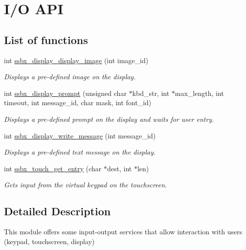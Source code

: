 \hypertarget{group__ssbx___i_o}{}\section{I/O A\+PI}
\label{group__ssbx___i_o}
\subsection*{List of functions}
\begin{DoxyCompactItemize}
\item 
int \hyperlink{group__ssbx___i_o_ga52d5005d7bb36355592b9ef2309281e2}{ssbx\+\_\+display\+\_\+display\+\_\+image} (int image\+\_\+id)
\begin{DoxyCompactList}\small\item\em Displays a pre-\/defined image on the display. \end{DoxyCompactList}\item 
int \hyperlink{group__ssbx___i_o_ga701c4c43823bad80a39745de2b5ad3af}{ssbx\+\_\+display\+\_\+prompt} (unsigned char $\ast$kbd\+\_\+str, int $\ast$max\+\_\+length, int timeout, int message\+\_\+id, char mask, int font\+\_\+id)
\begin{DoxyCompactList}\small\item\em Displays a pre-\/defined prompt on the display and waits for user entry. \end{DoxyCompactList}\item 
int \hyperlink{group__ssbx___i_o_ga40574f625e50f59357a9c363305bf76e}{ssbx\+\_\+display\+\_\+write\+\_\+message} (int message\+\_\+id)
\begin{DoxyCompactList}\small\item\em Displays a pre-\/defined text message on the display. \end{DoxyCompactList}\item 
int \hyperlink{group__ssbx___i_o_gaefc88ab3af9c2f984281ac32723d0633}{ssbx\+\_\+touch\+\_\+get\+\_\+entry} (char $\ast$dest, int $\ast$len)
\begin{DoxyCompactList}\small\item\em Gets input from the virtual keypad on the touchscreen. \end{DoxyCompactList}\end{DoxyCompactItemize}


\subsection{Detailed Description}
This module offers some input-\/output services that allow interaction with users (keypad, touchscreen, display) 

